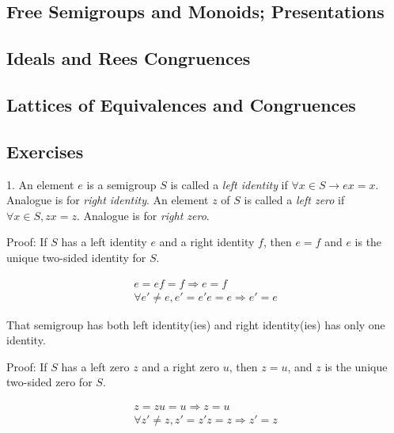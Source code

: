 \subsection[6]{Free Semigroups and Monoids; Presentations}
\subsection[7]{Ideals and Rees Congruences}
\subsection[8]{Lattices of Equivalences and Congruences}
\subsection[9]{Exercises}
1. An element $e$ is a semigroup $S$ is called a \emph{left identity} if $\forall x \in S\rightarrow ex = x$. Analogue is for \emph{right identity}.
An element $z$ of $S$ is called a \emph{left zero} if $\forall x \in S, zx=z$. Analogue is for \emph{right zero}.

Proof: If $S$ has a left identity $e$ and a right identity $f$, then $e=f$ and $e$ is the unique two-sided identity for $S$.
\begin{Prof}
    \begin{align*}
        e=ef=f \Rightarrow e=f  \\
        \forall e' \neq e, e' = e'e = e \Rightarrow e'=e
    \end{align*}
\end{Prof}
That semigroup has both left identity(ies) and right identity(ies) has only one identity.


Proof: If $S$ has a left zero $z$ and a right zero $u$, then $z=u$, and $z$ is the unique two-sided zero for $S$.
\begin{Prof}
    \begin{align*}
        z=zu=u \Rightarrow z=u  \\
        \forall z'\neq z, z' = z'z = z \Rightarrow z'=z
    \end{align*}
\end{Prof}


